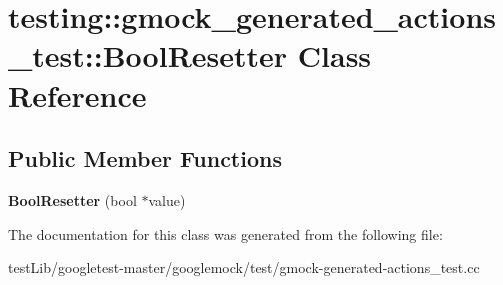 \hypertarget{classtesting_1_1gmock__generated__actions__test_1_1BoolResetter}{}\section{testing\+:\+:gmock\+\_\+generated\+\_\+actions\+\_\+test\+:\+:Bool\+Resetter Class Reference}
\label{classtesting_1_1gmock__generated__actions__test_1_1BoolResetter}
\subsection*{Public Member Functions}
\begin{DoxyCompactItemize}
\item 
\mbox{\label{classtesting_1_1gmock__generated__actions__test_1_1BoolResetter_a55776cb9ef3b358e48898bb0257646ea}} 
{\bfseries Bool\+Resetter} (bool $\ast$value)
\end{DoxyCompactItemize}


The documentation for this class was generated from the following file\+:\begin{DoxyCompactItemize}
\item 
test\+Lib/googletest-\/master/googlemock/test/gmock-\/generated-\/actions\+\_\+test.\+cc\end{DoxyCompactItemize}

